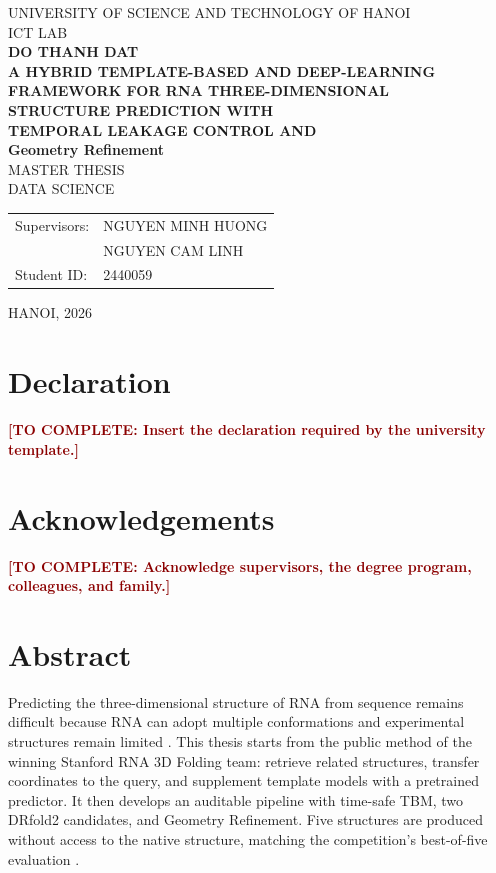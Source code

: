 \documentclass[12pt,a4paper,oneside]{report}
\newcommand{\todo}[1]{\textcolor{darkred}{\textbf{[TO COMPLETE: #1]}}}
\begin{document}
\begin{titlepage}
\begin{center}
  {\large UNIVERSITY OF SCIENCE AND TECHNOLOGY OF HANOI}\\[0.25cm]
  {\large ICT LAB}\\[1.6cm]
  {\Large\bfseries DO THANH DAT}\\[1.5cm]
  {\Large\bfseries
  A HYBRID TEMPLATE-BASED AND DEEP-LEARNING\\
  FRAMEWORK FOR RNA THREE-DIMENSIONAL\\
  STRUCTURE PREDICTION WITH\\
  TEMPORAL LEAKAGE CONTROL AND\\
  Geometry Refinement
  }\\[1.5cm]
  {\large MASTER THESIS}\\[0.5cm]
  {\large DATA SCIENCE}\\[1.6cm]
  \begin{tabularx}{0.94\textwidth}{lX}
  Supervisors: & NGUYEN MINH HUONG\\
  & NGUYEN CAM LINH\\
  Student ID: & 2440059
  \end{tabularx}
  \vfill
  {\large HANOI, 2026}
\end{center}
\end{titlepage}


\chapter*{Declaration}
\todo{Insert the declaration required by the university template.}

\chapter*{Acknowledgements}
\todo{Acknowledge supervisors, the degree program, colleagues, and family.}

\chapter*{Abstract}

Predicting the three-dimensional structure of RNA from sequence remains difficult
because RNA can adopt multiple conformations and experimental structures remain limited
\cite{zhang_experimental_review,rna_progress_review,state_of_rnart}. This thesis starts
from the public method of the winning Stanford RNA 3D Folding team: retrieve related
structures, transfer coordinates to the query, and supplement template models with a
pretrained predictor. It then develops an auditable pipeline with time-safe TBM, two
DRfold2 candidates, and Geometry Refinement. Five structures are produced without access
to the native structure, matching the competition's best-of-five evaluation
\cite{competition_paper,kaggle_competition,kaggle_top1}.
\end{document}
